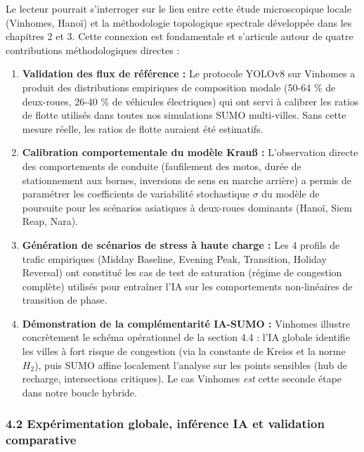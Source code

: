 \documentclass[10pt, a4paper]{article}
\begin{document}
Le lecteur pourrait s'interroger sur le lien entre cette étude
microscopique locale (Vinhomes, Hanoï) et la méthodologie topologique
spectrale développée dans les chapitres 2 et 3. Cette connexion est
fondamentale et s'articule autour de quatre contributions
méthodologiques directes :

\begin{enumerate}
\def\labelenumi{\arabic{enumi}.}
\item
  \textbf{Validation des flux de référence :} Le protocole YOLOv8 sur
  Vinhomes a produit des distributions empiriques de composition modale
  (50-64 \% de deux-roues, 26-40 \% de véhicules électriques) qui ont
  servi à calibrer les ratios de flotte utilisés dans toutes nos
  simulations SUMO multi-villes. Sans cette mesure réelle, les ratios de
  flotte auraient été estimatifs.
\item
  \textbf{Calibration comportementale du modèle Krauß :} L'observation
  directe des comportements de conduite (faufilement des motos, durée de
  stationnement aux bornes, inversions de sens en marche arrière) a
  permis de paramétrer les coefficients de variabilité stochastique
  \(\sigma\) du modèle de poursuite pour les scénarios asiatiques à
  deux-roues dominants (Hanoï, Siem Reap, Nara).
\item
  \textbf{Génération de scénarios de stress à haute charge :} Les 4
  profils de trafic empiriques (Midday Baseline, Evening Peak,
  Transition, Holiday Reversal) ont constitué les cas de test de
  saturation (régime de congestion complète) utilisés pour entraîner
  l'IA sur les comportements non-linéaires de transition de phase.
\item
  \textbf{Démonstration de la complémentarité IA-SUMO :} Vinhomes
  illustre concrètement le schéma opérationnel de la section 4.4 : l'IA
  globale identifie les villes à fort risque de congestion (via la
  constante de Kreiss et la norme \(H_2\)), puis SUMO affine localement
  l'analyse sur les points sensibles (hub de recharge, intersections
  critiques). Le cas Vinhomes \emph{est} cette seconde étape dans notre
  boucle hybride.
\end{enumerate}

\subsubsection{4.2 Expérimentation globale, inférence IA et validation
comparative}\label{expuxe9rimentation-globale-infuxe9rence-ia-et-validation-comparative}
\end{document}
